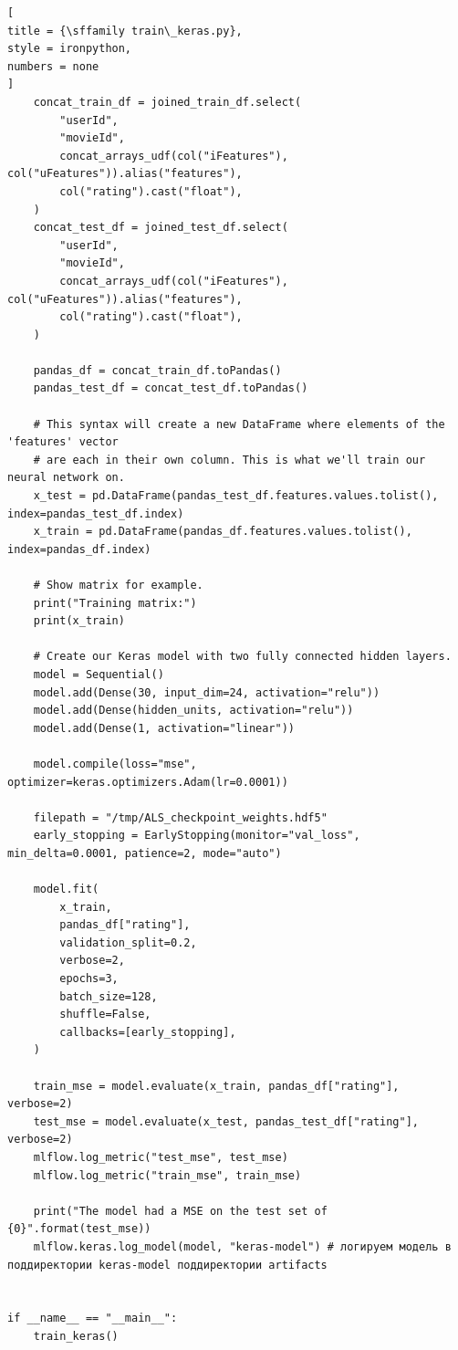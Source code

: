 \documentclass[%
	11pt,
	a4paper,
	utf8,
		]{article}
\begin{document}
\begin{lstlisting}[
title = {\sffamily train\_keras.py},
style = ironpython,
numbers = none	
]
	concat_train_df = joined_train_df.select(
		"userId",
		"movieId",
		concat_arrays_udf(col("iFeatures"), col("uFeatures")).alias("features"),
		col("rating").cast("float"),
	)
	concat_test_df = joined_test_df.select(
		"userId",
		"movieId",
		concat_arrays_udf(col("iFeatures"), col("uFeatures")).alias("features"),
		col("rating").cast("float"),
	)

	pandas_df = concat_train_df.toPandas()
	pandas_test_df = concat_test_df.toPandas()

	# This syntax will create a new DataFrame where elements of the 'features' vector
	# are each in their own column. This is what we'll train our neural network on.
	x_test = pd.DataFrame(pandas_test_df.features.values.tolist(), index=pandas_test_df.index)
	x_train = pd.DataFrame(pandas_df.features.values.tolist(), index=pandas_df.index)

	# Show matrix for example.
	print("Training matrix:")
	print(x_train)

	# Create our Keras model with two fully connected hidden layers.
	model = Sequential()
	model.add(Dense(30, input_dim=24, activation="relu"))
	model.add(Dense(hidden_units, activation="relu"))
	model.add(Dense(1, activation="linear"))

	model.compile(loss="mse", optimizer=keras.optimizers.Adam(lr=0.0001))

	filepath = "/tmp/ALS_checkpoint_weights.hdf5"
	early_stopping = EarlyStopping(monitor="val_loss", min_delta=0.0001, patience=2, mode="auto")

	model.fit(
		x_train,
		pandas_df["rating"],
		validation_split=0.2,
		verbose=2,
		epochs=3,
		batch_size=128,
		shuffle=False,
		callbacks=[early_stopping],
	)

	train_mse = model.evaluate(x_train, pandas_df["rating"], verbose=2)
	test_mse = model.evaluate(x_test, pandas_test_df["rating"], verbose=2)
	mlflow.log_metric("test_mse", test_mse)
	mlflow.log_metric("train_mse", train_mse)

	print("The model had a MSE on the test set of {0}".format(test_mse))
	mlflow.keras.log_model(model, "keras-model") # логируем модель в поддиректории keras-model поддиректории artifacts


if __name__ == "__main__":
	train_keras()
\end{lstlisting}
\end{document}
